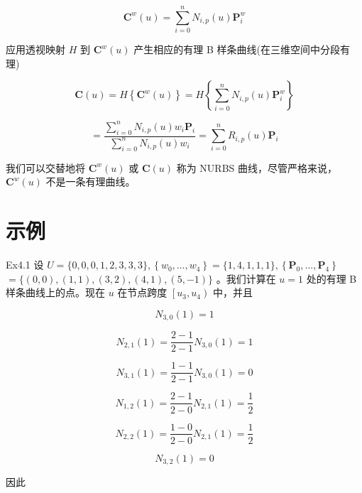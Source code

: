 \documentclass[../main.tex]{subfiles}
\begin{document}
\[
{\mathbf{C}}^{w}\left( u\right)  = \mathop{\sum }\limits_{{i = 0}}^{n}{N}_{i,p}\left( u\right) {\mathbf{P}}_{i}^{w} \tag{4.5}
\]





应用透视映射 \(H\) 到 \({\mathbf{C}}^{w}\left( u\right)\) 产生相应的有理 B 样条曲线(在三维空间中分段有理)

\[
\mathbf{C}\left( u\right)  = H\left\{  {{\mathbf{C}}^{w}\left( u\right) }\right\}   = H\left\{  {\mathop{\sum }\limits_{{i = 0}}^{n}{N}_{i,p}\left( u\right) {\mathbf{P}}_{i}^{w}}\right\}
\]

\[
= \frac{\mathop{\sum }\limits_{{i = 0}}^{n}{N}_{i,p}\left( u\right) {w}_{i}{\mathbf{P}}_{i}}{\mathop{\sum }\limits_{{i = 0}}^{n}{N}_{i,p}\left( u\right) {w}_{i}} = \mathop{\sum }\limits_{{i = 0}}^{n}{R}_{i,p}\left( u\right) {\mathbf{P}}_{i}
\]



我们可以交替地将 \({\mathbf{C}}^{w}\left( u\right)\) 或 \(\mathbf{C}\left( u\right)\) 称为 NURBS 曲线，尽管严格来说， \({\mathbf{C}}^{w}\left( u\right)\) 不是一条有理曲线。

\section*{示例}

Ex4.1 设 \(U = \{ 0,0,0,1,2,3,3,3\} ,\left\{  {{w}_{0},\ldots ,{w}_{4}}\right\}   = \{ 1,4,1,1,1\} ,\left\{  {{\mathbf{P}}_{0},\ldots ,{\mathbf{P}}_{4}}\right\}\)  \(= \{ \left( {0,0}\right) ,\left( {1,1}\right) ,\left( {3,2}\right) ,\left( {4,1}\right) ,\left( {5, - 1}\right) \}\) 。我们计算在 \(u = 1\) 处的有理 B 样条曲线上的点。现在 \(u\) 在节点跨度 \(\left\lbrack  {{u}_{3},{u}_{4}}\right)\) 中，并且

\[
{N}_{3,0}\left( 1\right)  = 1
\]

\[
{N}_{2,1}\left( 1\right)  = \frac{2 - 1}{2 - 1}{N}_{3,0}\left( 1\right)  = 1
\]

\[
{N}_{3,1}\left( 1\right)  = \frac{1 - 1}{2 - 1}{N}_{3,0}\left( 1\right)  = 0
\]

\[
{N}_{1,2}\left( 1\right)  = \frac{2 - 1}{2 - 0}{N}_{2,1}\left( 1\right)  = \frac{1}{2}
\]

\[
{N}_{2,2}\left( 1\right)  = \frac{1 - 0}{2 - 0}{N}_{2,1}\left( 1\right)  = \frac{1}{2}
\]

\[
{N}_{3,2}\left( 1\right)  = 0
\]



因此
\end{document}
